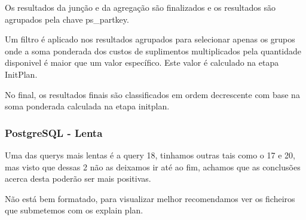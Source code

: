 \documentclass{article}
\begin{document}
Os resultados da junção e da agregação são finalizados e os resultados são agrupados pela chave ps\_partkey.

Um filtro é aplicado nos resultados agrupados para selecionar apenas os grupos onde a soma ponderada dos custos de suplimentos multiplicados pela quantidade disponivel é maior que um valor específico. Este valor é calculado na etapa InitPlan.

No final, os resultados finais são classificados em ordem decrescente com base na soma ponderada calculada na etapa initplan.

\subsubsection{PostgreSQL - Lenta}
\texttt{}\par Uma das querys mais lentas é a query 18, tinhamos outras tais como o 17 e 20, mas visto que dessas 2 não as deixamos ir até ao fim, achamos que as conclusões acerca desta poderão ser mais positivas.

Não está bem formatado, para visualizar melhor recomendamos ver os ficheiros que submetemos com os explain plan.
\end{document}
